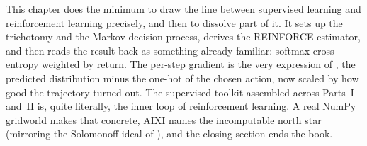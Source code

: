 This chapter does the minimum to draw the line between supervised learning
and reinforcement learning precisely, and then to dissolve part of it. It
sets up the trichotomy and the Markov decision process, derives the
REINFORCE estimator, and then reads the result back as something already
familiar: softmax cross-entropy weighted by return. The per-step gradient is
the very expression of , the predicted distribution minus
the one-hot of the chosen action, now scaled by how good the trajectory
turned out. The supervised toolkit assembled across Parts~I and~II is, quite
literally, the inner loop of reinforcement learning. A real NumPy gridworld
makes that concrete, AIXI names the incomputable north star (mirroring the
Solomonoff ideal of ), and the closing section
ends the book.







